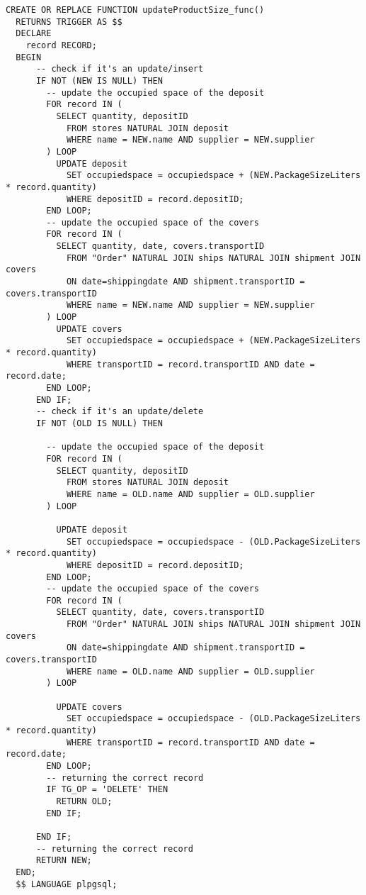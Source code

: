 \begin{lstlisting}[caption={Funzione \textbf{updateProductSize}}]
  CREATE OR REPLACE FUNCTION updateProductSize_func()
  RETURNS TRIGGER AS $$
  DECLARE
    record RECORD;
  BEGIN
      -- check if it's an update/insert
      IF NOT (NEW IS NULL) THEN
        -- update the occupied space of the deposit
        FOR record IN (
          SELECT quantity, depositID
            FROM stores NATURAL JOIN deposit
            WHERE name = NEW.name AND supplier = NEW.supplier
        ) LOOP
          UPDATE deposit
            SET occupiedspace = occupiedspace + (NEW.PackageSizeLiters * record.quantity)
            WHERE depositID = record.depositID;
        END LOOP;
        -- update the occupied space of the covers
        FOR record IN (
          SELECT quantity, date, covers.transportID
            FROM "Order" NATURAL JOIN ships NATURAL JOIN shipment JOIN covers
            ON date=shippingdate AND shipment.transportID = covers.transportID
            WHERE name = NEW.name AND supplier = NEW.supplier
        ) LOOP
          UPDATE covers
            SET occupiedspace = occupiedspace + (NEW.PackageSizeLiters * record.quantity)
            WHERE transportID = record.transportID AND date = record.date;
        END LOOP;
      END IF;
      -- check if it's an update/delete
      IF NOT (OLD IS NULL) THEN

        -- update the occupied space of the deposit
        FOR record IN (
          SELECT quantity, depositID
            FROM stores NATURAL JOIN deposit
            WHERE name = OLD.name AND supplier = OLD.supplier
        ) LOOP

          UPDATE deposit
            SET occupiedspace = occupiedspace - (OLD.PackageSizeLiters * record.quantity)
            WHERE depositID = record.depositID;
        END LOOP;
        -- update the occupied space of the covers
        FOR record IN (
          SELECT quantity, date, covers.transportID
            FROM "Order" NATURAL JOIN ships NATURAL JOIN shipment JOIN covers
            ON date=shippingdate AND shipment.transportID = covers.transportID
            WHERE name = OLD.name AND supplier = OLD.supplier
        ) LOOP
    
          UPDATE covers
            SET occupiedspace = occupiedspace - (OLD.PackageSizeLiters * record.quantity)
            WHERE transportID = record.transportID AND date = record.date;
        END LOOP;
        -- returning the correct record
        IF TG_OP = 'DELETE' THEN
          RETURN OLD;
        END IF;

      END IF;
      -- returning the correct record
      RETURN NEW;
  END;
  $$ LANGUAGE plpgsql;
\end{lstlisting}

